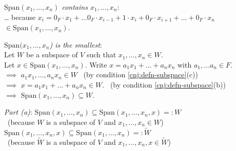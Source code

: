 \documentclass[
  12pt,
  a4paper,
  twoside]{article}
\theoremstyle{plain}
\theoremstyle{definition}
\begin{document}
\emph{\(\mathrm{Span}(x_1, \dots, x_n)\) contains \(x_1, \dots, x_n\)}:\\
\hspace*{0.333em}\hspace*{0.333em}\hspace*{0.333em}\hspace*{0.333em}\ldots{} because \(x_{i} = 0_{F}\cdot x_1 + \dots 0_{F}\cdot x_{i-1} + 1 \cdot x_{i} + 0_{F}\cdot x_{i+1} + \dots + 0_{F}\cdot x_n\) \(\in \mathrm{Span}(x_1,\dots,x_n)\).

\emph{\(\mathrm{Span}(x_1, \dots, x_n\)) is the smallest}:\\
\hspace*{0.333em}\hspace*{0.333em}\hspace*{0.333em}\hspace*{0.333em} Let \(W\) be a subspace of \(V\) such that \(x_1, \dots, x_n \in W\).\\
\hspace*{0.333em}\hspace*{0.333em}\hspace*{0.333em}\hspace*{0.333em} Let \(x \in \mathrm{Span}(x_1, \dots, x_n)\). Write \(x = a_1x_1 + \dots + a_nx_n\) with \(a_1, \dots a_n \in F\).\\
\hspace*{0.333em}\hspace*{0.333em}\hspace*{0.333em}\hspace*{0.333em} \(\implies\) \(a_1x_1, \dots, a_nx_n \in W\) \hfill~{(by condition \ref{cnj:defn-subspace}(c))}\\
\hspace*{0.333em}\hspace*{0.333em}\hspace*{0.333em}\hspace*{0.333em} \(\implies\) \(x = a_1x_1 + \dots + a_nx_n \in W\). \hfill~{(by condition \ref{cnj:defn-subspace}(b))}\\
\hspace*{0.333em}\hspace*{0.333em}\hspace*{0.333em}\hspace*{0.333em} \(\implies\) \(\mathrm{Span}(x_1,\dots,x_n)\subseteq W\).

\emph{Part (a)}: \(\mathrm{Span}(x_1, \dots, x_n) \subseteq \mathrm{Span}(x_1, \dots, x_n,x) =: W\)\\
\hspace*{0.333em}\hfill~{(because \(W\) is a subspace of \(V\) and \(x_1, \dots, x_n \in W\))}\\
\hspace*{0.333em}\hspace*{0.333em}\hspace*{0.333em}\hspace*{0.333em} \(\mathrm{Span}(x_1, \dots, x_n,x) \subseteq \mathrm{Span}(x_1, \dots, x_n) =: \widetilde{W}\)\\
\hspace*{0.333em}\hfill~{(because \(\widetilde{W}\) is a subspace of \(V\) and \(x_1, \dots, x_n,x \in \widetilde{W}\))}
\end{document}
